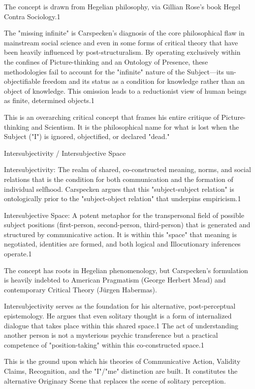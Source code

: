 \documentclass{book}
\begin{document}
The concept is drawn from Hegelian philosophy, via Gillian Rose's book Hegel Contra Sociology.1

The "missing infinite" is Carspecken's diagnosis of the core philosophical flaw in mainstream social science and even in some forms of critical theory that have been heavily influenced by post-structuralism. By operating exclusively within the confines of Picture-thinking and an Ontology of Presence, these methodologies fail to account for the "infinite" nature of the Subject—its un-objectifiable freedom and its status as a condition for knowledge rather than an object of knowledge. This omission leads to a reductionist view of human beings as finite, determined objects.1

This is an overarching critical concept that frames his entire critique of Picture-thinking and Scientism. It is the philosophical name for what is lost when the Subject ("I") is ignored, objectified, or declared "dead."

\parencite{Carspecken2018}
Intersubjectivity / Intersubjective Space

\textit{}

Intersubjectivity: The realm of shared, co-constructed meaning, norms, and social relations that is the condition for both communication and the formation of individual selfhood. Carspecken argues that this "subject-subject relation" is ontologically prior to the "subject-object relation" that underpins empiricism.1

Intersubjective Space: A potent metaphor for the transpersonal field of possible subject positions (first-person, second-person, third-person) that is generated and structured by communicative action. It is within this "space" that meaning is negotiated, identities are formed, and both logical and Illocutionary inferences operate.1

The concept has roots in Hegelian phenomenology, but Carspecken's formulation is heavily indebted to American Pragmatism (George Herbert Mead) and contemporary Critical Theory (Jürgen Habermas).

Intersubjectivity serves as the foundation for his alternative, post-perceptual epistemology. He argues that even solitary thought is a form of internalized dialogue that takes place within this shared space.1 The act of understanding another person is not a mysterious psychic transference but a practical competence of "position-taking" within this co-constructed space.1

This is the ground upon which his theories of Communicative Action, Validity Claims, Recognition, and the "I"/"me" distinction are built. It constitutes the alternative Originary Scene that replaces the scene of solitary perception.
\end{document}
